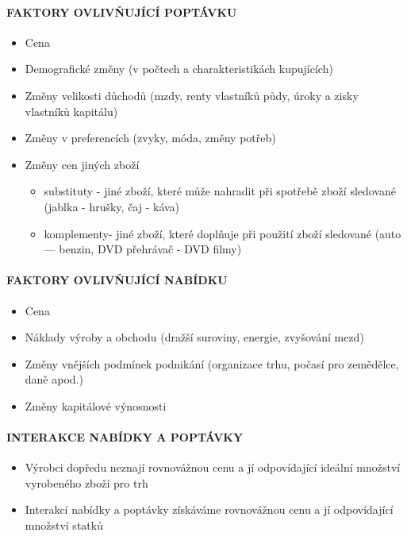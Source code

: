 \documentclass[11pt,a4paper,twoside]{book}
\begin{document}
\paragraph*{FAKTORY OVLIVŇUJÍCÍ POPTÁVKU}
\begin{itemize}
	\item Cena
	\item Demografické změny (v počtech a charakteristikách kupujících)
	\item Změny velikosti důchodů (mzdy, renty vlastníků půdy, úroky a zisky vlastníků kapitálu)
	\item Změny v preferencích (zvyky, móda, změny potřeb)
	\item Změny cen jiných zboží
		\begin{itemize}
			\item substituty - jiné zboží, které může nahradit při spotřebě zboží sledované (jablka - hrušky, čaj - káva)
			\item komplementy- jiné zboží, které doplňuje při použití zboží sledované (auto — benzin, DVD přehrávač - DVD filmy)
		\end{itemize}
\end{itemize}

\paragraph*{FAKTORY OVLIVŇUJÍCÍ NABÍDKU}
\begin{itemize}
	\item Cena
	\item Náklady výroby a obchodu (dražší suroviny, energie, zvyšování mezd)
	\item Změny vnějších podmínek podnikání (organizace trhu, počasí pro zemědělce, daně apod.)
	\item Změny kapitálové výnosnosti
\end{itemize}

\paragraph*{INTERAKCE NABÍDKY A POPTÁVKY}
\begin{itemize}
	\item Výrobci dopředu neznají rovnovážnou cenu a jí odpovídající ideální množství vyrobeného zboží pro trh
	\item Interakcí nabídky a poptávky získáváme rovnovážnou cenu a jí odpovídající množství statků
\end{itemize}
\end{document}
